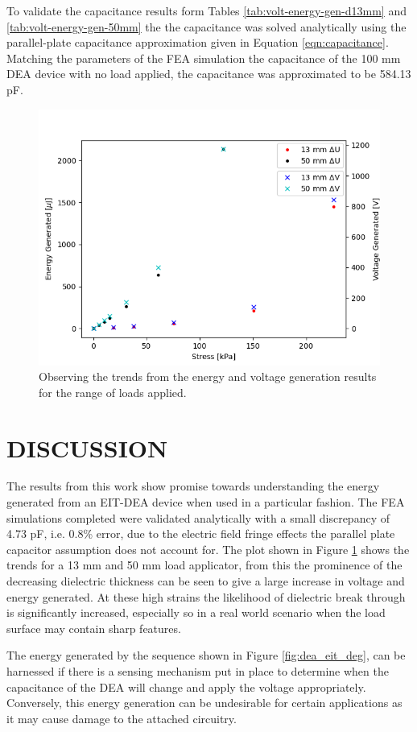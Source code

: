 To validate the capacitance results form Tables \ref{tab:volt-energy-gen-d13mm} and \ref{tab:volt-energy-gen-50mm} the the capacitance was solved analytically using the parallel-plate capacitance approximation given in Equation \ref{eqn:capacitance}. Matching the parameters of the FEA simulation the capacitance of the 100 mm DEA device with no load applied, the capacitance was approximated to be 584.13 pF.

\begin{figure}[H]
	\centering
	\includegraphics[width=0.6\linewidth]{Figures/plot_DEG_stress_vs_VgenUgen.png}
	\caption{Observing the trends from the energy and voltage generation results for the range of loads applied.}
	\label{fig:volt-energy-gen-13_and_50mm}
\end{figure}


\section{DISCUSSION}
\label{sec:concs_disc}
The results from this work show promise towards understanding the energy generated from an EIT-DEA device when used in a particular fashion. The FEA simulations completed were validated analytically with a small discrepancy of 4.73 pF, i.e. 0.8\% error, due to the electric field fringe effects the parallel plate capacitor assumption does not account for. The plot shown in Figure \ref{fig:volt-energy-gen-13_and_50mm} shows the trends for a 13 mm and 50 mm load applicator, from this the prominence of the decreasing dielectric thickness can be seen to give a large increase in voltage and energy generated. At these high strains the likelihood of dielectric break through is significantly increased, especially so in a real world scenario when the load surface may contain sharp features.

The energy generated by the sequence shown in Figure \ref{fig:dea_eit_deg}, can be harnessed if there is a sensing mechanism put in place to determine when the capacitance of the DEA will change and apply the voltage appropriately. Conversely, this energy generation can be undesirable for certain applications as it may cause damage to the attached circuitry.

